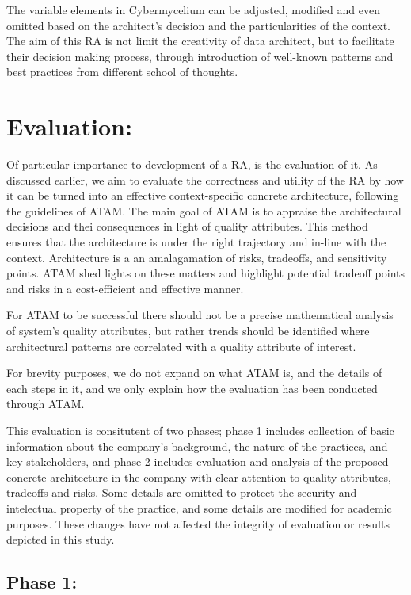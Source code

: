\documentclass[review]{elsarticle}
\begin{document}
The variable elements in Cybermycelium can be adjusted, modified and even omitted based on the architect's decision and the particularities of the context. The aim of this RA is not limit the creativity of data architect, but to facilitate their decision making process, through introduction of well-known patterns and best practices from different school of thoughts.

\section{Evaluation:}

Of particular importance to development of a RA, is the evaluation of it. As discussed earlier, we aim to evaluate the correctness and utility of the RA by how it can be turned into an effective context-specific concrete architecture, following the guidelines of ATAM. The main goal of ATAM is to appraise the architectural decisions and thei consequences in light of quality attributes. This method ensures that the architecture is under the right trajectory and in-line with the context. Architecture is a an amalagamation of risks, tradeoffs, and sensitivity points. ATAM shed lights on these matters and highlight potential tradeoff points and risks in a cost-efficient and effective manner.

For ATAM to be successful there should not be a precise mathematical analysis of system's quality attributes, but rather trends should be identified where architectural patterns are correlated with a quality attribute of interest.

For brevity purposes, we do not expand on what ATAM is, and the details of each steps in it, and we only explain how the evaluation has been conducted through ATAM.

This evaluation is consitutent of two phases; phase 1 includes collection of basic information about the company's background, the nature of the practices, and key stakeholders, and phase 2 includes evaluation and analysis of the proposed concrete architecture in the company with clear attention to quality attributes, tradeoffs and risks. Some details are omitted to protect the security and intelectual property of the practice, and some details are modified for academic purposes. These changes have not affected the integrity of evaluation or results depicted in this study.

\subsection{Phase 1:}
\end{document}
